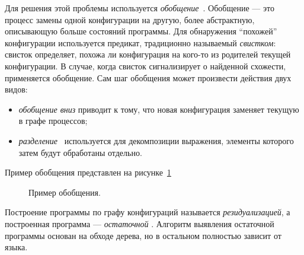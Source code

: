 Для решения этой проблемы используется \emph{обобщение}~\cite{scGen}. Обобщение --- это процесс
замены одной конфигурации на другую, более абстрактную, описывающую больше состояний
программы. Для обнаружения ``похожей'' конфигурации используется предикат,
традиционно называемый \emph{свистком}:
свисток определяет, похожа ли конфигурация на кого-то из родителей текущей конфигурации.
В случае, когда свисток сигнализирует о найденной схожести, применяется обобщение.
Сам шаг обобщения может произвести действия двух видов:
\begin{itemize}
\item \emph{обобщение вниз} приводит к тому, что новая конфигурация заменяет текущую в графе процессов;
\item \emph{разделение}~ используется для декомпозиции выражения, элементы которого затем
будут обработаны отдельно.
\end{itemize}
Пример обобщения представлен на рисунке~\ref{fig:pgraphGenExample}
\begin{figure}[h!]
\center
{}


\caption{Пример обобщения.}
\label{fig:pgraphGenExample}
\end{figure}

Построение программы по графу конфигураций называется \emph{резидуализацией}, а
построенная программа --- \emph{остаточной} .
Алгоритм выявления остаточной программы основан на обходе дерева, но
в остальном полностью зависит от языка.

